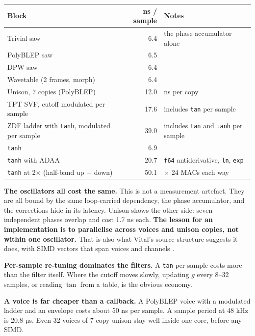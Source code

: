 \documentclass[conference]{IEEEtran}
\begin{document}
\begin{table}[t]
\centering\footnotesize
\begin{tabularx}{\textwidth}{@{}>{\raggedright\arraybackslash}Xr>{\raggedright\arraybackslash}X@{}}
\toprule
\textbf{Block} & \textbf{ns / sample} & \textbf{Notes} \\
\midrule
Trivial saw & 6.4 & the phase accumulator alone \\
PolyBLEP saw & 6.5 &  \\
DPW saw & 6.4 &  \\
Wavetable (2 frames, morph) & 6.4 &  \\
Unison, 7 copies (PolyBLEP) & 12.0 & 1.7 ns per copy \\
TPT SVF, cutoff modulated per sample & 17.6 & includes \texttt{tan} per sample \\
ZDF ladder with \texttt{tanh}, modulated per sample & 39.0 & includes \texttt{tan} and \texttt{tanh} per sample \\
\texttt{tanh} & 6.9 &  \\
\texttt{tanh} with ADAA & 20.7 & \texttt{f64} antiderivative, \texttt{ln}, \texttt{exp} \\
\texttt{tanh} at 2× (half-band up + down) & 50.1 & 2 × 24 MACs each way \\
\bottomrule
\end{tabularx}
\end{table}

\textbf{The oscillators all cost the same.} This is not a measurement artefact. They are all bound by the same loop-carried dependency, the phase accumulator, and the corrections hide in its latency. Unison shows the other side: seven independent phases overlap and cost 1.7 ns each. \textbf{The lesson for an implementation is to parallelise across voices and unison copies, not within one oscillator.} That is also what Vital's source structure suggests it does, with SIMD vectors that span voices and channels \cite{S1}.

\textbf{Per-sample re-tuning dominates the filters.} A \texttt{tan} per sample costs more than the filter itself. Where the cutoff moves slowly, updating $g$ every 8–32 samples, or reading $\tan$ from a table, is the obvious economy.

\textbf{A voice is far cheaper than a callback.} A PolyBLEP voice with a modulated ladder and an envelope costs about 50 ns per sample. A sample period at 48 kHz is 20.8 µs. Even 32 voices of 7-copy unison stay well inside one core, before any SIMD.
\end{document}
